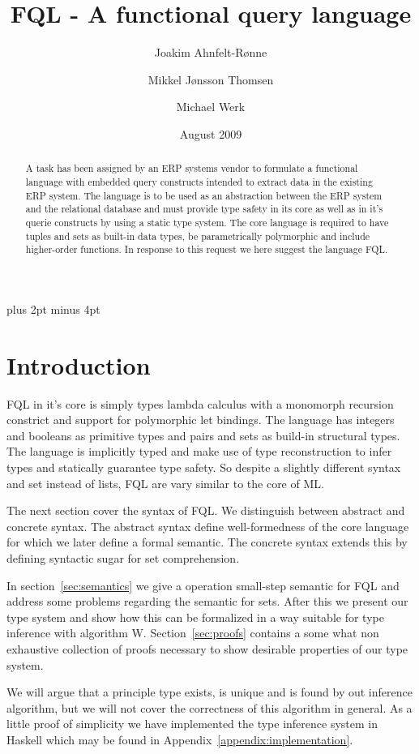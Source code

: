\documentclass[a4paper]{article}
\title{FQL - A functional query language}
\date{August 2009}
\author{Joakim Ahnfelt-Rønne \and Mikkel Jønsson Thomsen \and Michael Werk}
\begin{document}
\parindent=0pt
\parskip=8pt plus 2pt minus 4pt
\maketitle

\begin{abstract}\noindent
A task has been assigned by an ERP systems vendor to formulate a functional language with embedded query constructs intended to extract data in the existing ERP system. The language is to be used as an abstraction between the ERP system and the relational database and must provide type safety in its core as well as in it's querie constructs by using a static type system. The core language is required to have tuples and sets as built-in data types, be parametrically polymorphic and include higher-order functions. In response to this request we here suggest the language FQL.
\end{abstract}


\section{Introduction}

FQL in it's core is simply types lambda calculus with a monomorph recursion constrict and support for polymorphic let bindings. The language has integers and booleans as primitive types and pairs and sets as build-in structural types. The language is implicitly typed and make use of type reconstruction to infer types and statically guarantee type safety. So despite a slightly different syntax and set instead of lists, FQL are vary similar to the core of ML. 

The next section cover the syntax of FQL. We distinguish  between abstract and concrete syntax. The abstract syntax define well-formedness of the core language for which we later define a formal semantic. The concrete syntax extends this by defining syntactic sugar for set comprehension.

In section~\ref{sec:semantics} we give a operation small-step semantic for FQL and address some problems regarding the semantic for sets. After this we present our type system and show how this can be formalized in a way suitable for type inference with algorithm W. Section~\ref{sec:proofs} contains a some what non exhaustive collection of proofs necessary to show desirable properties of our type system. 

We will argue that a principle type exists, is unique and is found by out inference algorithm, but we will not cover the correctness of this algorithm in general. As a little proof of simplicity we have implemented the type inference system in Haskell which may be found in Appendix~\ref{appendix:implementation}.
\end{document}
